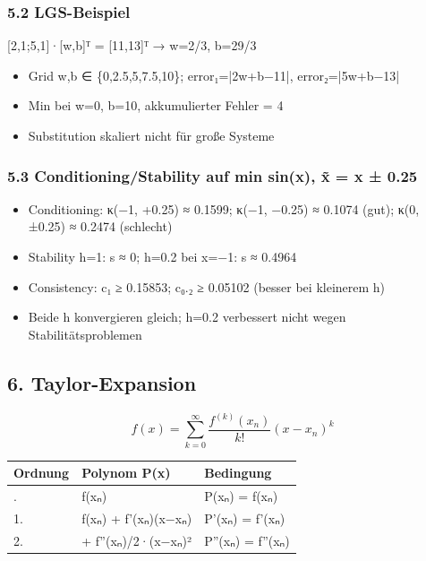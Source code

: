 \documentclass[11pt, a4paper]{article}
\begin{document}
\subsubsection{5.2 LGS-Beispiel}
[2,1;5,1]·[w,b]ᵀ = [11,13]ᵀ → w=2/3, b=29/3

\begin{itemize}
  \item Grid w,b ∈ \{0,2.5,5,7.5,10\}; error₁=|2w+b−11|, error₂=|5w+b−13|
  \item Min bei w=0, b=10, akkumulierter Fehler = 4
  \item Substitution skaliert nicht für große Systeme
\end{itemize}


\subsubsection{5.3 Conditioning/Stability auf min sin(x), x̃ = x ± 0.25}
\begin{itemize}
  \item Conditioning: κ(−1, +0.25) ≈ 0.1599; κ(−1, −0.25) ≈ 0.1074 (gut); κ(0, ±0.25) ≈ 0.2474 (schlecht)
  \item Stability h=1: s ≈ 0; h=0.2 bei x=−1: s ≈ 0.4964
  \item Consistency: c₁ ≥ 0.15853; c₀.₂ ≥ 0.05102 (besser bei kleinerem h)
  \item Beide h konvergieren gleich; h=0.2 verbessert nicht wegen Stabilitätsproblemen
\end{itemize}


\subsection{6. Taylor-Expansion}

\[
f(x) = \sum_{k=0}^{\infty} \frac{f^{(k)}(x_n)}{k!}(x-x_n)^k
\]



{\small
\begin{tabularx}{\linewidth}{XXX}
\hline
\rowcolor{tableheadbg}
{\color{white}\textbf{Ordnung}} & {\color{white}\textbf{Polynom P(x)}} & {\color{white}\textbf{Bedingung}} \\[2pt]
\hline
\endhead
\hline
\endfoot
0. & f(xₙ) & P(xₙ) = f(xₙ) \\
1. & f(xₙ) + f'(xₙ)(x−xₙ) & P'(xₙ) = f'(xₙ) \\
2. & + f''(xₙ)/2·(x−xₙ)² & P''(xₙ) = f''(xₙ) \\
\end{tabularx}
}
\end{document}
